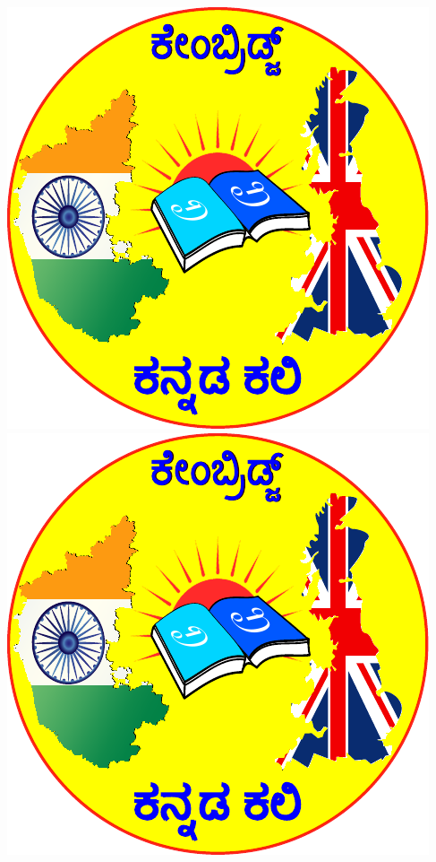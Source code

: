 \documentclass[16pt]{book}
\begin{document}
\begin{titlepage}
	\vspace{3cm} %
	\includegraphics[scale=0.4]{KKali_logo.pdf}
	\includegraphics[scale=0.4]{KKali_logo.pdf}

\end{titlepage}
\end{document}
